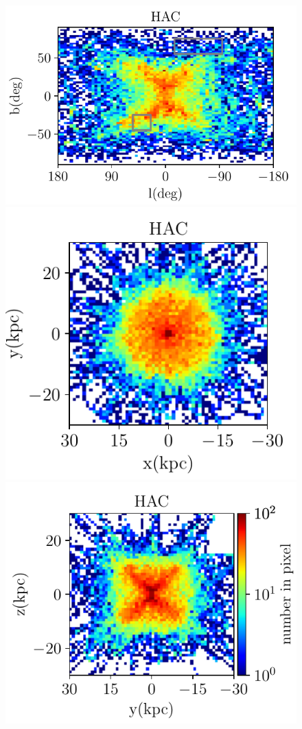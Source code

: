 \documentclass[fleqn,usenatbib]{mnras}
\begin{document}
\begin{figure}
	     \includegraphics[scale=0.52]{HAC_orbits_8Gyrs_lb_defaultmass.pdf}
	     	     \includegraphics[scale=0.52]{HAC_orbits_8Gyrs_xy_defaultmass.pdf}
	     	     	     \includegraphics[scale=0.52]{HAC_orbits_8Gyrs_yz_defaultmass.pdf}

\end{figure}
\end{document}
